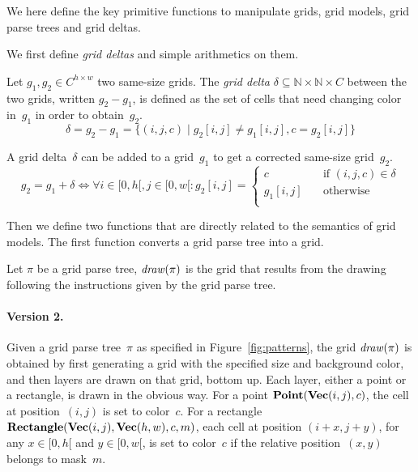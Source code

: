 \documentclass[a4paper]{llncs}
\newcommand{\nat}{\mathbb{N}}
\begin{document}
We here define the key primitive functions to manipulate grids, grid
models, grid parse trees and grid deltas.

We first define {\em grid deltas} and simple arithmetics on them.

\begin{definition}
  Let $g_1, g_2 \in C^{h \times w}$ two same-size grids. The {\em grid
    delta} $\delta \subseteq \nat \times \nat \times C$ between the
  two grids, written $g_2 - g_1$, is defined as the set of cells that
  need changing color in~$g_1$ in order to obtain~$g_2$.
  \[ \delta = g_2 - g_1 = \{ (i,j,c) \mid g_2[i,j] \neq g_1[i,j], c = g_2[i,j] \} \]
  
  A grid delta~$\delta$ can be added to a grid~$g_1$ to get a corrected same-size grid~$g_2$.
  \[ g_2 = g_1 + \delta \iff \forall i \in [0,h[, j \in [0,w[: g_2[i,j] =
    \left\{
      \begin{array}{ll}
        c & \quad\textrm{if~} (i,j,c) \in \delta \\
        g_1[i,j] & \quad\textrm{otherwise} \\
      \end{array}\right. \]
\end{definition}

Then we define two functions that are directly related to the
semantics of grid models. The first function converts a grid parse tree
into a grid.

\begin{definition}
  Let $\pi$ be a grid parse tree, ${\it draw}(\pi)$ is the grid that
  results from the drawing following the instructions given by the
  grid parse tree.  
\end{definition}

\paragraph{Version 2.} Given a grid parse tree~$\pi$ as specified in
Figure~\ref{fig:patterns}, the grid ${\it draw}(\pi)$ is obtained by
first generating a grid with the specified size and background color,
and then layers are drawn on that grid, bottom up. Each layer, either
a point or a rectangle, is drawn in the obvious way. For a point
${\bf Point}({\bf Vec}(i,j),c)$, the cell at position~$(i,j)$ is set
to color~$c$. For a rectangle
${\bf Rectangle}({\bf Vec}(i,j),{\bf Vec}(h,w),c,m)$, each cell at
position $(i+x,j+y)$, for any $x \in [0,h[$ and $y \in [0,w[$, is set
to color~$c$ if the relative position~$(x,y)$ belongs to mask~$m$.
\end{document}
